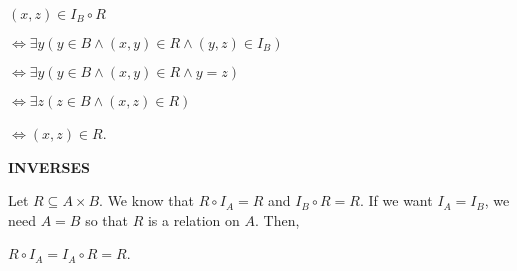 \documentclass[12pt, a4paper]{article}
\begin{document}
\vspace{4mm}

\hspace{10mm}$(x,z)\in I_B\circ R$\par
\vspace{2mm}
\hspace{20mm}$\Leftrightarrow\exists y(y\in B\wedge(x,y)\in R\wedge(y,z)\in I_B)$\par
\vspace{2mm}
\hspace{20mm}$\Leftrightarrow\exists y(y\in B\wedge(x,y)\in R\wedge y=z)$\par
\vspace{2mm}
\hspace{20mm}$\Leftrightarrow\exists z(z\in B\wedge(x,z)\in R)$\par
\vspace{2mm}
\hspace{20mm}$\Leftrightarrow (x,z)\in R$. \blacksquare


\begin{flushleft}

\textbf{INVERSES}

\vspace{4mm}

Let $R\subseteq A\times B$. We know that $R\circ I_A=R$ and $I_B\circ R=R$. If we want $I_A=I_B$, we need $A=B$ so that $R$ is a relation on $A$. Then,\par

\vspace{4mm}

\centerline{$R\circ I_A=I_A\circ R=R$.}

\end{flushleft}

\newpage
\end{document}
